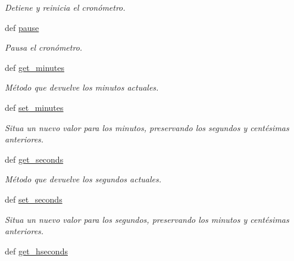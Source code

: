 \begin{DoxyCompactItemize}
\begin{DoxyCompactList}\small\item\em \-Detiene y reinicia el cronómetro. \end{DoxyCompactList}\item 
\hypertarget{classengine_1_1timer_1_1Timer_a70d510fe4c880432c8908f15d306d5b3}{
def \hyperlink{classengine_1_1timer_1_1Timer_a70d510fe4c880432c8908f15d306d5b3}{pause}}
\label{classengine_1_1timer_1_1Timer_a70d510fe4c880432c8908f15d306d5b3}

\begin{DoxyCompactList}\small\item\em \-Pausa el cronómetro. \end{DoxyCompactList}\item 
\hypertarget{classengine_1_1timer_1_1Timer_ab9181d6b9e85d00db8d0ba879524dc35}{
def \hyperlink{classengine_1_1timer_1_1Timer_ab9181d6b9e85d00db8d0ba879524dc35}{get\-\_\-minutes}}
\label{classengine_1_1timer_1_1Timer_ab9181d6b9e85d00db8d0ba879524dc35}

\begin{DoxyCompactList}\small\item\em \-Método que devuelve los minutos actuales. \end{DoxyCompactList}\item 
def \hyperlink{classengine_1_1timer_1_1Timer_a79ed4117f7adca153c6d468358be4528}{set\-\_\-minutes}
\begin{DoxyCompactList}\small\item\em \-Situa un nuevo valor para los minutos, preservando los segundos y centésimas anteriores. \end{DoxyCompactList}\item 
\hypertarget{classengine_1_1timer_1_1Timer_a3a0886fdb073a077ff37da0e96600137}{
def \hyperlink{classengine_1_1timer_1_1Timer_a3a0886fdb073a077ff37da0e96600137}{get\-\_\-seconds}}
\label{classengine_1_1timer_1_1Timer_a3a0886fdb073a077ff37da0e96600137}

\begin{DoxyCompactList}\small\item\em \-Método que devuelve los segundos actuales. \end{DoxyCompactList}\item 
def \hyperlink{classengine_1_1timer_1_1Timer_a23ee45fc08976a692d57831be104a1f9}{set\-\_\-seconds}
\begin{DoxyCompactList}\small\item\em \-Situa un nuevo valor para los segundos, preservando los minutos y centésimas anteriores. \end{DoxyCompactList}\item 
\hypertarget{classengine_1_1timer_1_1Timer_a7812d8a838f75ad64b55d2e7d46afb24}{
def \hyperlink{classengine_1_1timer_1_1Timer_a7812d8a838f75ad64b55d2e7d46afb24}{get\-\_\-hseconds}}
\label{classengine_1_1timer_1_1Timer_a7812d8a838f75ad64b55d2e7d46afb24}


\end{DoxyCompactItemize}
